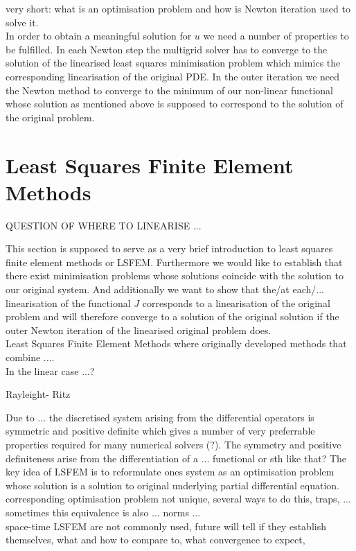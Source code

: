 \documentclass[fleqn, a4paper, 11pt, bibliography=totoc]{report}
\begin{document}
very short: what is an optimisation problem and how is Newton iteration used to solve it. 
\\

In order to obtain a meaningful solution for $u$ we need a number of properties to be fulfilled. In each Newton step the multigrid solver has to converge to the solution of the linearised least squares minimisation problem which mimics the corresponding linearisation of the original PDE. In the outer iteration we need the Newton method to converge to the minimum of our non-linear functional whose solution as mentioned above is supposed to correspond to the solution of the original problem.

\section{Least Squares Finite Element Methods}


QUESTION OF WHERE TO LINEARISE ...

This section is supposed to serve as a very brief introduction to least squares finite element methods or LSFEM. Furthermore we would like to establish that there exist minimisation problems whose solutions coincide with the solution to our original system. And additionally we want to show that the/at each/... linearisation of the functional $J$ corresponds to a linearisation of the original problem and will therefore converge to a solution of the original solution if the outer Newton iteration of the linearised original problem does. \\
\smallskip
Least Squares Finite Element Methods where originally developed  methods that combine .... \\
In the linear case ...? 

Rayleight- Ritz

Due to ... the discretised system arising from the differential operators is symmetric and positive definite which gives a number of very preferrable properties required for many numerical solvers (?). The symmetry and positive definiteness arise from the differentiation of a ... functional or sth like that?
The key idea of LSFEM is to reformulate ones system as an optimisation problem whose solution is a solution to original underlying partial differential equation. corresponding optimisation problem not unique, several ways to do this, traps, ... sometimes this equivalence is also ... norms ... 
\bigskip
\\ 
space-time LSFEM are not commonly used, future will tell if they establish themselves, what and how to compare to, what convergence to expect, 
\end{document}
